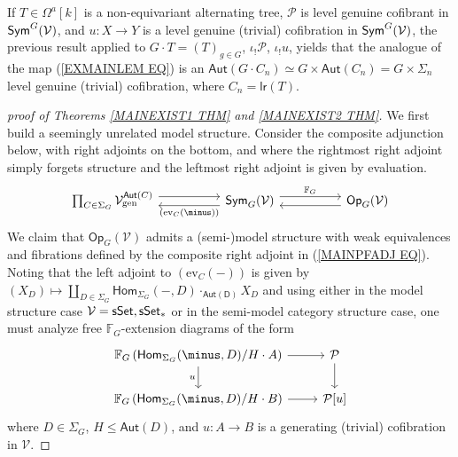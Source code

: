 \documentclass[a4paper,10pt]{article}%
\begin{document}
\begin{remark}\label{EXMAINLEM REM}
If %
$T \in \Omega^a[k]$ is a non-equivariant alternating tree, 
$\mathcal{P}$ is level genuine cofibrant in $\mathsf{Sym}^G(\mathcal V)$,
and
$u \colon X \to Y$ is a level genuine (trivial) cofibration in $\mathsf{Sym}^G(\mathcal V)$,
the previous result applied to
$G \cdot T = (T)_{g \in G}$,
$\iota_{!} \mathcal{P}$,
$\iota_{!} u$,
yields that
the analogue of the map
(\ref{EXMAINLEM EQ})
is an $\mathsf{Aut}(G \cdot C_n) 
\simeq G 
\times \mathsf{Aut}(C_n)=
G \times \Sigma_n$ level genuine (trivial) cofibration,
where $C_n = \mathsf{lr}(T)$.
\end{remark}


\begin{proof}
[proof of Theorems \ref{MAINEXIST1 THM} and \ref{MAINEXIST2 THM}]
We first build a seemingly unrelated model structure.
Consider the composite adjunction below, with right adjoints on the bottom, and
where the rightmost right adjoint simply forgets structure and the leftmost right adjoint is given by evaluation.
\begin{equation}\label{MAINPFADJ EQ}
\begin{tikzcd}[column sep =5em]
	\prod_{C \in \Sigma_G}
	\mathcal{V}^{\mathsf{Aut}(C)}_{\text{gen}}
	\ar[shift left=1.5]{r}
&
	\mathsf{Sym}_{G}(\mathcal{V}) 
	\arrow[l, shift left=1.5, "\left(\text{ev}_C(\minus)\right)"] 
	\arrow[r, shift left=1.5,swap,"\mathbb{F}_G"']
&
	\mathsf{Op}_G(\mathcal{V})
	\ar[shift left=1.5]{l}
\end{tikzcd}
\end{equation}
We claim that $\mathsf{Op}_G(\mathcal{V})$ admits a (semi-)model structure with weak equivalences and fibrations defined by the composite right adjoint in 
(\ref{MAINPFADJ EQ}).
Noting that the left adjoint to 
$\left( \text{ev}_C (\minus) \right)$
is given by
$(X_D) \mapsto \coprod_{D \in \Sigma_G}
\mathsf{Hom}_{\Sigma_G} (\minus, D) 
\cdot_{\mathsf{Aut(D)}} X_D$
and using either 
\cite[Thm. 11.3.2]{Hi03} 
in the model structure case
$\mathcal{V} = \mathsf{sSet},\mathsf{sSet}_{\**}$
or 
\cite[Thm. 2.2.2]{WY15}
in the semi-model category structure case,
one must analyze free $\mathbb{F}_G$-extension diagrams of the form
\[ 
\begin{tikzcd} 
	\mathbb{F}_G
	\left(\mathsf{Hom}_{\Sigma_G}(\minus,D)/H \cdot A \right) \arrow[d, "u"'] \arrow[r] 
&
	\P \arrow[d]
\\ 
	\mathbb{F}_G 
	\left(\mathsf{Hom}_{\Sigma_G}(\minus,D)/H \cdot B \right)
	\arrow[r]
&
	\P[u] 
\end{tikzcd} 
\]
where $D \in \Sigma_G$,
$H \leq \mathsf{Aut}(D)$,
and $u \colon A \to B$ is a generating (trivial)
cofibration in $\mathcal{V}$.


\end{proof}
\end{document}
